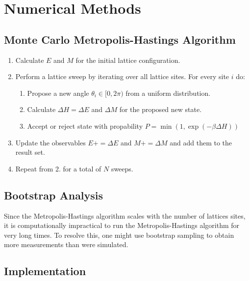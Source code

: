 \section{Numerical Methods}
\subsection{Monte Carlo Metropolis-Hastings Algorithm}

\begin{enumerate}
	\item Calculate $E$ and $M$ for the initial lattice configuration.
	\item Perform a lattice sweep by iterating over all lattice sites. For every site $i$ do:
	\begin{enumerate}
		\item Propose a new angle $\theta_i \in [0,2\pi)$ from a uniform distribution.
		\item Calculate $\Delta H = \Delta E$ and $\Delta M$ for the proposed new state.
		\item Accept or reject state with propability $P = \min{(1, \exp{(-\beta\Delta H)})}$
	\end{enumerate}
	\item Update the observables $E \mathrel{{+}{=}} \Delta E$ and $M \mathrel{{+}{=}} \Delta M$ and add them to the result set.
	\item Repeat from 2. for a total of $N$ sweeps.
\end{enumerate}

\subsection{Bootstrap Analysis}
Since the Metropolis-Hastings algorithm scales with the number of lattices sites, it is computationally impractical to run the Metropolis-Hastings algorithm for very long times. To resolve this, one might use bootstrap sampling to obtain more measurements than were simulated. 

\subsection{Implementation}